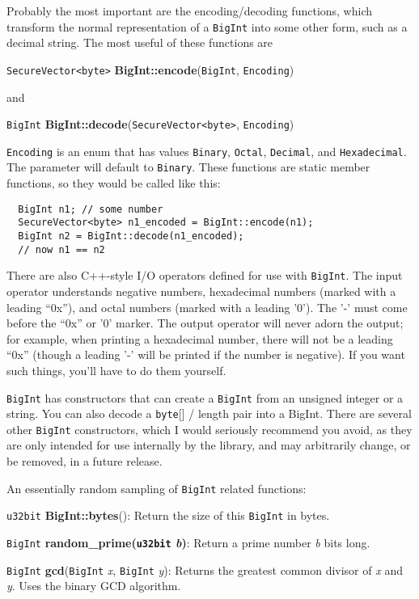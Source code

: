 \documentclass{article}
\newcommand{\function}[1]{\textbf{#1}}
\newcommand{\type}[1]{\texttt{#1}}
\renewcommand{\arg}[1]{\textsl{#1}}
\begin{document}
Probably the most important are the encoding/decoding functions, which
transform the normal representation of a \type{BigInt} into some other form,
such as a decimal string. The most useful of these functions are

\type{SecureVector<byte>} \function{BigInt::encode}(\type{BigInt},
\type{Encoding})

\noindent
and

\type{BigInt} \function{BigInt::decode}(\type{SecureVector<byte>},
\type{Encoding})

\type{Encoding} is an enum that has values \type{Binary}, \type{Octal},
\type{Decimal}, and \type{Hexadecimal}. The parameter will default to
\type{Binary}. These functions are static member functions, so they would be
called like this:

\begin{verbatim}
  BigInt n1; // some number
  SecureVector<byte> n1_encoded = BigInt::encode(n1);
  BigInt n2 = BigInt::decode(n1_encoded);
  // now n1 == n2
\end{verbatim}

There are also C++-style I/O operators defined for use with \type{BigInt}. The
input operator understands negative numbers, hexadecimal numbers (marked with a
leading ``0x''), and octal numbers (marked with a leading '0'). The '-' must
come before the ``0x'' or '0' marker. The output operator will never adorn the
output; for example, when printing a hexadecimal number, there will not be a
leading ``0x'' (though a leading '-' will be printed if the number is
negative). If you want such things, you'll have to do them yourself.

\type{BigInt} has constructors that can create a \type{BigInt} from an unsigned
integer or a string. You can also decode a \type{byte}[] / length pair into a
BigInt. There are several other \type{BigInt} constructors, which I would
seriously recommend you avoid, as they are only intended for use internally by
the library, and may arbitrarily change, or be removed, in a future release.

An essentially random sampling of \type{BigInt} related functions:

\type{u32bit} \function{BigInt::bytes}(): Return the size of this \type{BigInt}
in bytes.

\type{BigInt} \function{random\_prime(\type{u32bit} \arg{b})}: Return a prime
number \arg{b} bits long.

\type{BigInt} \function{gcd}(\type{BigInt} \arg{x}, \type{BigInt} \arg{y}):
Returns the greatest common divisor of \arg{x} and \arg{y}. Uses the binary
GCD algorithm.
\end{document}
